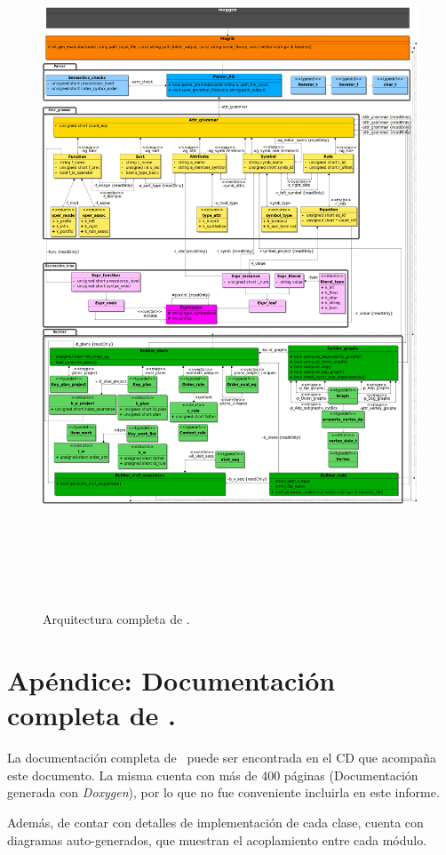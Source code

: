 \begin{figure}[!ht]\centering
\includegraphics[width=450pt, height=593pt]{diagramas/clases_full.png}
\caption{\label{fig:arquitec-full}Arquitectura completa de \maggen.}
\end{figure}



\chapter{Apéndice: Documentación completa de \maggen.}
\label{chap:appendix-b}
La documentación completa de \maggen\ puede ser encontrada en el CD que acompaña este documento. La misma cuenta con más de 400 páginas (Documentación generada con \textit{Doxygen}), por lo que no fue conveniente incluirla en este informe. 

Además, de contar con detalles de implementación de cada clase, cuenta con diagramas auto-generados, que muestran el acoplamiento entre cada módulo.

